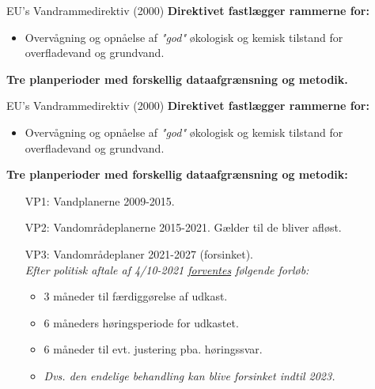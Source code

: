 \begin{frame}{EU’s Vandrammedirektiv (2000)}
  \textbf{Direktivet fastlægger rammerne for:}
  \begin{itemize}
    \item Overvågning og opnåelse af \textit{"god"} økologisk og kemisk tilstand for overfladevand og grundvand.
  \end{itemize}
  \textbf{Tre planperioder med forskellig dataafgrænsning og metodik.}
  \vfill
\end{frame}
\begin{frame}{EU’s Vandrammedirektiv (2000)}
  \textbf{Direktivet fastlægger rammerne for:}
  \begin{itemize}
    \item Overvågning og opnåelse af \textit{"god"} økologisk og kemisk tilstand for overfladevand og grundvand.
  \end{itemize}
  \textbf{Tre planperioder med forskellig dataafgrænsning og metodik:}
  \begin{enumerate}
    \item[VP1:] Vandplanerne 2009-2015.
    \item[VP2:] Vandområdeplanerne 2015-2021. Gælder til de bliver afløst.
    \item[VP3:] Vandområdeplaner 2021-2027 (forsinket).\\
    \textit{Efter politisk aftale af 4/10-2021 \href{https://www.ft.dk/samling/20201/almdel/MOF/bilag/366/2340807/index.htm}{forventes} følgende forløb:}
    \begin{itemize}
      \item 3 måneder til færdiggørelse af udkast.
      \item 6 måneders høringsperiode for udkastet.
      \item 6 måneder til evt. justering pba. høringssvar.
      \item \textit{Dvs. den endelige behandling kan blive forsinket indtil 2023.}
    \end{itemize}
  \end{enumerate}
\end{frame}
